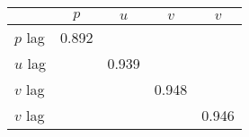 \begin{tabular}{l*{4}{c}}
\toprule
                &\multicolumn{1}{c}{$ p $}&\multicolumn{1}{c}{$ u $}&\multicolumn{1}{c}{$ v $}&\multicolumn{1}{c}{$ v $}\\
\midrule
$ p $ lag       &    0.892&         &         &         \\
$ u $ lag       &         &    0.939&         &         \\
$ v $ lag       &         &         &    0.948&         \\
$ v $ lag       &         &         &         &    0.946\\
\bottomrule
\end{tabular}
